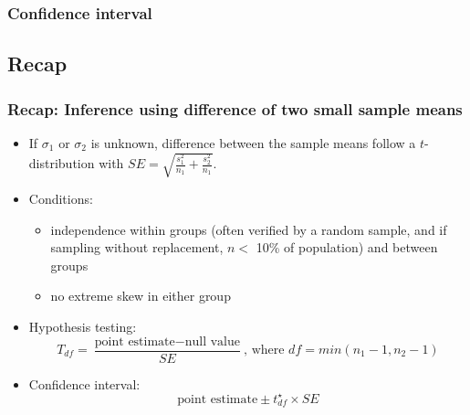 
\begin{frame}
\frametitle{Confidence interval}


\pause


\end{frame}


\subsection{Recap}


\begin{frame}
\frametitle{Recap: Inference using difference of two small sample means}

\begin{itemize}

\item If $\sigma_1$ or $\sigma_2$ is unknown, difference between the sample means follow a $t$-distribution with $SE = \sqrt{ \frac{s_1^2}{n_1} + \frac{s_2^2}{n_1} }$.

\pause

\item Conditions: 
\begin{itemize}
\item independence within groups (often verified by a random sample, and if sampling without replacement, $n < $ 10\% of population) and between groups
\item no extreme skew in either group
\end{itemize}

\pause

\item Hypothesis testing: 
\[ T_{df} = \frac{\text{point estimate} - \text{null value}}{SE}\text{, where }df = min(n_1 - 1, n_2 - 1) \]

\pause

\item Confidence interval:
\[ \text{point estimate} \pm t_{df}^\star \times SE \]

\end{itemize}

\end{frame}

